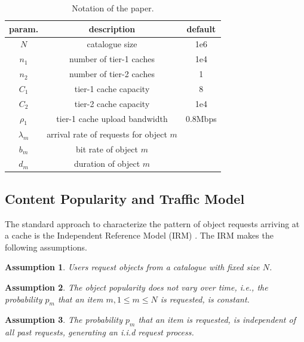 \begin{table}[tb]
\centering
\caption{Notation of the paper.}
\label{tab:notation}
\begin{tabular}{|c|c|c|}
\hline
param. & description & default \\
\hline
$N$ & catalogue size & 1e6 \\
$n_{1}$ & number of tier-1 caches & 1e4 \\
$n_{2}$ & number of tier-2 caches & 1 \\
$C_{1}$ & tier-1 cache capacity & 8 \\
$C_{2}$ & tier-2 cache capacity & 1e4 \\
$\rho_{1}$ & tier-1 cache upload bandwidth & 0.8Mbps \\
$\lambda_m$ & arrival rate of requests for object $m$& \\
$b_m$ & bit rate of object $m$& \\
$d_m$ & duration of object $m$& \\
\hline
\end{tabular}
\end{table}

\subsection{Content Popularity and Traffic Model}
The standard approach to characterize the pattern of object requests arriving at a cache is the Independent Reference Model (IRM) \cite{coffman1973operating}.
The IRM makes the following assumptions.

\newtheorem{irma}{Assumption}\begin{irma}\label{catalouge}
Users request objects from a catalogue with fixed size $N$.
\end{irma}
\newtheorem{irmb}[irma]{Assumption}\begin{irmb}\label{pmc}
The object popularity does not vary over time, i.e., the probability $p_m$ that an item $m, 1\leq m \leq N$ is requested, is constant.
\end{irmb}
\newtheorem{irmc}[irma]{Assumption}\begin{irmc}\label{iid}
The probability $p_m$ that an item is requested, is independent of all past requests, generating an i.i.d request process.
\end{irmc}

